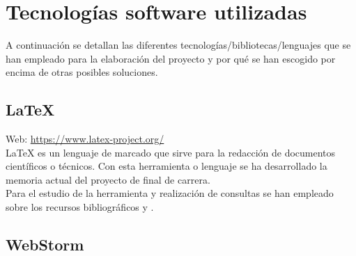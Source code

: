 \section{Tecnologías software utilizadas}


A continuación se detallan las diferentes tecnologías/bibliotecas/lenguajes que se han empleado para la elaboración del proyecto y por qué se han escogido por encima de otras posibles soluciones.


\subsection{\LaTeX}

Web: \url{https://www.latex-project.org/}\\

\LaTeX \: es un lenguaje de marcado que sirve para la redacción de documentos científicos o técnicos. Con esta herramienta o lenguaje se ha desarrollado la memoria actual del proyecto de final de carrera.\\

Para el estudio de la herramienta y realización de consultas se han empleado sobre los recursos bibliográficos \cite{book:LaTeX} y \cite{website:6}.\\


\subsection{WebStorm}


